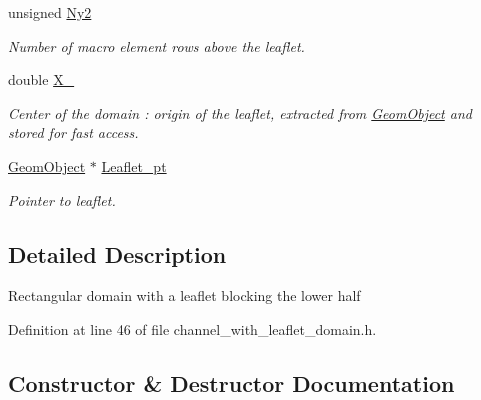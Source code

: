 \begin{DoxyCompactItemize}
unsigned \hyperlink{classoomph_1_1ChannelWithLeafletDomain_a1596a538b4263b42d20f9c098c5f2752}{Ny2}
\begin{DoxyCompactList}\small\item\em Number of macro element rows above the leaflet. \end{DoxyCompactList}\item 
double \hyperlink{classoomph_1_1ChannelWithLeafletDomain_a165703af81538c28bbbd780d65bbb333}{X\+\_}
\begin{DoxyCompactList}\small\item\em Center of the domain \+: origin of the leaflet, extracted from \hyperlink{classoomph_1_1GeomObject}{Geom\+Object} and stored for fast access. \end{DoxyCompactList}\item 
\hyperlink{classoomph_1_1GeomObject}{Geom\+Object} $\ast$ \hyperlink{classoomph_1_1ChannelWithLeafletDomain_a08a8eb7078cdc788dc7643e09e7405fb}{Leaflet\+\_\+pt}
\begin{DoxyCompactList}\small\item\em Pointer to leaflet. \end{DoxyCompactList}\end{DoxyCompactItemize}


\subsection{Detailed Description}
Rectangular domain with a leaflet blocking the lower half 

Definition at line 46 of file channel\+\_\+with\+\_\+leaflet\+\_\+domain.\+h.



\subsection{Constructor \& Destructor Documentation}
\mbox{\label{classoomph_1_1ChannelWithLeafletDomain_a6cca7d06136de0c76facec2a92b0939e}} 
